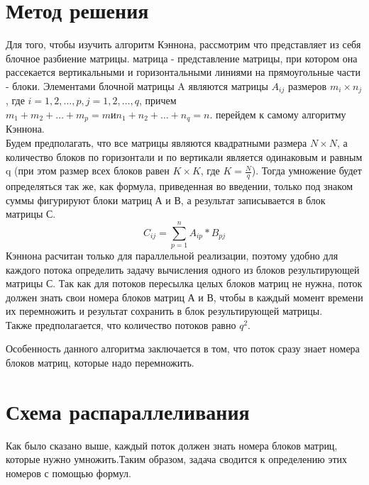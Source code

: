 \documentclass{report}
\begin{document}
\section{\hspace{0.6cm}Метод решения}
Для того, чтобы изучить алгоритм Кэннона, рассмотрим что представляет из себя блочное разбиение матрицы.
 матрица - представление матрицы, при котором она рассекается вертикальными и горизонтальными линиями на прямоугольные части - блоки. Элементами блочной матрицы A являются матрицы $A_{ij}$ размеров $m_i\times n_j$, где $i=1,2,\ldots,p, j=1,2,\ldots,q$, причем $m_1+m_2+\ldots+m_p=m и n_1+n_2+\ldots+n_q=n$.
 перейдем к самому алгоритму Кэннона.\\
Будем предполагать, что все матрицы являются квадратными размера $N\times N$, а количество блоков по горизонтали и по вертикали является одинаковым и равным q (при этом размер всех блоков равен $K\times K$, где $K = \frac{N}{q}$). Тогда умножение будет определяться так же, как формула, приведенная во введении, только под знаком суммы фигурируют блоки матриц А и В, а результат записывается в блок матрицы С.\\
\begin{equation}\label{eq:multblock}
C_{ij} =  \sum \limits_{p=1}^{n} A_{ip} * B_{pj}
\end{equation}
 Кэннона расчитан только для параллельной реализации, поэтому удобно для каждого потока определить задачу вычисления одного из блоков результирующей матрицы С. Так как для потоков пересылка целых блоков матриц не нужна, поток должен знать свои номера блоков матриц А и В, чтобы в каждый момент времени их перемножить и результат сохранить в блок результирующей матрицы.\\
Также предполагается, что количество потоков равно $q^2$.

Особенность данного алгоритма заключается в том, что поток сразу знает номера блоков матриц, которые надо перемножить.

\newpage

\section{\hspace{0.6cm}Схема распараллеливания}
Как было сказано выше, каждый поток должен знать номера блоков матриц, которые нужно умножить.Таким образом, задача сводится к определению этих номеров с помощью формул.
\end{document}
